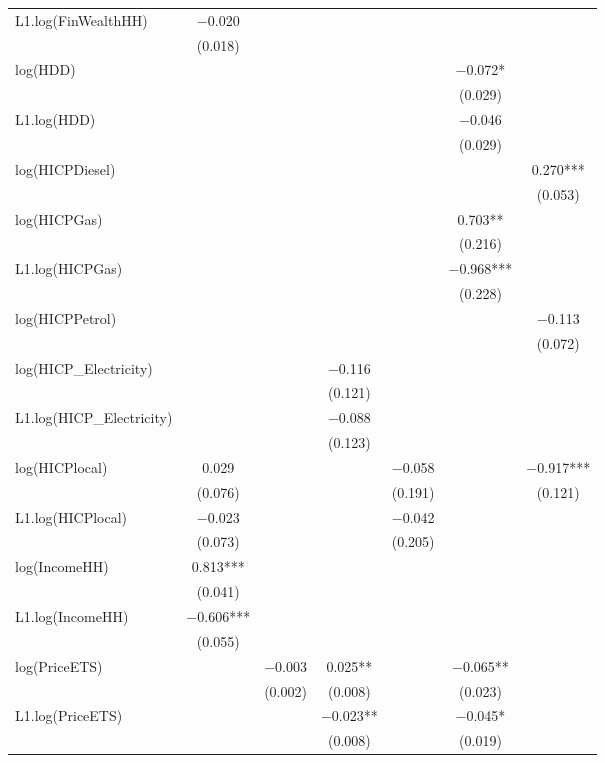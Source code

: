 \begin{table}
{\begin{tabular}[t]{lcccccc}
L1.log(FinWealthHH) & \num{-0.020} &  &  &  &  & \\
 & (\num{0.018}) &  &  &  &  & \\
log(HDD) &  &  &  &  & \num{-0.072}* & \\
 &  &  &  &  & (\num{0.029}) \vphantom{1} & \\
L1.log(HDD) &  &  &  &  & \num{-0.046} & \\
 &  &  &  &  & (\num{0.029}) & \\
log(HICPDiesel) &  &  &  &  &  & \num{0.270}***\\
 &  &  &  &  &  & (\num{0.053})\\
log(HICPGas) &  &  &  &  & \num{0.703}** & \\
 &  &  &  &  & (\num{0.216}) & \\
L1.log(HICPGas) &  &  &  &  & \num{-0.968}*** & \\
 &  &  &  &  & (\num{0.228}) & \\
log(HICPPetrol) &  &  &  &  &  & \num{-0.113}\\
 &  &  &  &  &  & (\num{0.072})\\
log(HICP\_Electricity) &  &  & \num{-0.116} &  &  & \\
 &  &  & (\num{0.121}) &  &  & \\
L1.log(HICP\_Electricity) &  &  & \num{-0.088} &  &  & \\
 &  &  & (\num{0.123}) &  &  & \\
log(HICPlocal) & \num{0.029} &  &  & \num{-0.058} &  & \num{-0.917}***\\
 & (\num{0.076}) &  &  & (\num{0.191}) &  & (\num{0.121})\\
L1.log(HICPlocal) & \num{-0.023} &  &  & \num{-0.042} &  & \\
 & (\num{0.073}) &  &  & (\num{0.205}) &  & \\
log(IncomeHH) & \num{0.813}*** &  &  &  &  & \\
 & (\num{0.041}) &  &  &  &  & \\
L1.log(IncomeHH) & \num{-0.606}*** &  &  &  &  & \\
 & (\num{0.055}) &  &  &  &  & \\
log(PriceETS) &  & \num{-0.003} & \num{0.025}** &  & \num{-0.065}** & \\
 &  & (\num{0.002}) & (\num{0.008}) &  & (\num{0.023}) & \\
L1.log(PriceETS) &  &  & \num{-0.023}** &  & \num{-0.045}* & \\
 &  &  & (\num{0.008}) &  & (\num{0.019}) & \\

\end{tabular}}
\end{table}
